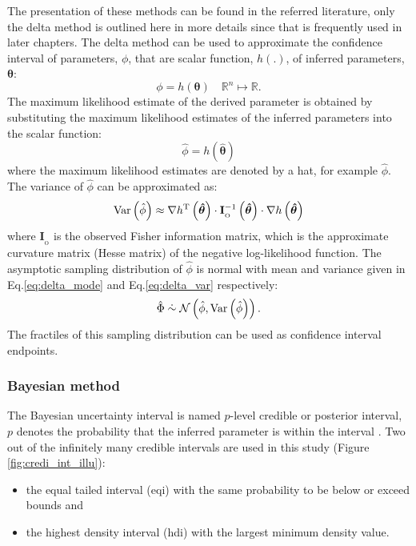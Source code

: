The presentation of these methods can be found in the referred literature, only the delta method is outlined here in more details since that is frequently used in later chapters. The delta method can be used to approximate the confidence interval of parameters, $\phi$, that are scalar function, $h(.)$, of inferred parameters, $\boldsymbol{\theta}$:
\begin{equation}
\label{eq:scalar_fun}
	\phi  = h\left( {{\boldsymbol{\theta }}} \right) \quad \mathbb{R}^n\mapsto\mathbb{R}.
\end{equation}
The maximum likelihood estimate of the derived parameter is obtained by substituting the maximum likelihood estimates of the inferred parameters into the scalar function:
\begin{equation}
\label{eq:delta_mode}
	\hat \phi  = h\left( {{\boldsymbol{\hat \theta }}} \right)
\end{equation}
where the maximum likelihood estimates are denoted by a hat, for example $\hat \phi$.
The variance of $\hat \phi$ can be approximated as:
\begin{equation}
\label{eq:delta_var}
	{\mathrm{Var}\left({\hat \phi} \right)} \approx {\nabla {h^{\mathrm{T}}\left({\boldsymbol{\hat \theta }} \right)} \cdot {\bf{I}}_{_{\mathrm{O}}}^{ - 1}\left({\boldsymbol{\hat \theta }} \right) \cdot \nabla {h\left({\boldsymbol{\hat \theta }} \right)}}
\end{equation}
where ${\mathbf{I}}_{_{\mathrm{O}}}$ is the observed Fisher information matrix, which is the approximate curvature matrix (Hesse matrix) of the negative log-likelihood function. The asymptotic sampling distribution of $\hat \phi$ is normal with mean and variance given in Eq.\ref{eq:delta_mode} and Eq.\ref{eq:delta_var} respectively:
\begin{equation}
	\hat \Phi \; \dot{\sim} \; {\cal N}\left({\hat \phi ,{\mathrm{Var}\left({\hat \phi} \right)}}  \right).
\end{equation}
The fractiles of this sampling distribution can be used as confidence interval endpoints.
\subsubsection*{Bayesian method}
The Bayesian uncertainty interval is named $p$-level credible or posterior interval, $p$ denotes the probability that the inferred parameter is within the interval \citep{Gelman2003}. Two out of the infinitely many credible intervals are used in this study (Figure \ref{fig:credi_int_illu}):
\begin{itemize}
	\item the equal tailed interval (eqi) with the same probability to be below or exceed bounds and
	\item the highest density interval (hdi) with the largest minimum density value.
\end{itemize}

